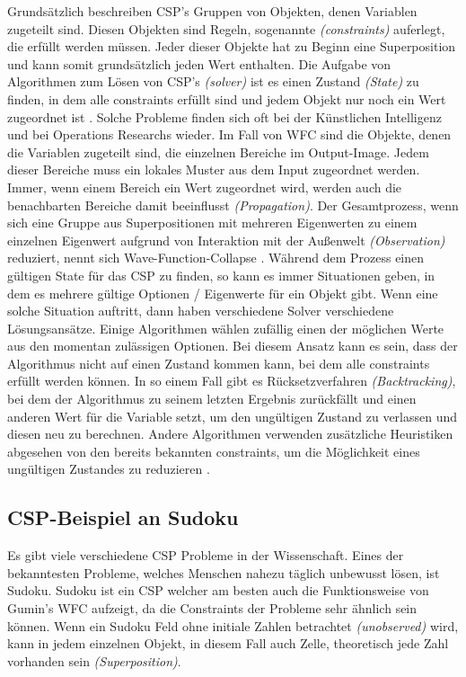 \documentclass[12pt, a4paper,twoside,openright]{report} %
\begin{document}
Grundsätzlich beschreiben CSP's Gruppen von Objekten, denen Variablen zugeteilt sind.
Diesen Objekten sind Regeln, sogenannte \textit{(constraints)} auferlegt, die erfüllt werden müssen.
Jeder dieser Objekte hat zu Beginn eine Superposition und kann somit grundsätzlich jeden Wert enthalten.
Die Aufgabe von Algorithmen zum Lösen von CSP's \textit{(solver)} ist es einen Zustand \textit{(State)} zu finden,
in dem alle constraints erfüllt sind und jedem Objekt nur noch ein Wert zugeordnet ist \cite{Lecoutre2009ConstraintNT}.
Solche Probleme finden sich oft bei der Künstlichen Intelligenz und bei Operations Researchs wieder.
Im Fall von WFC sind die Objekte, denen die Variablen zugeteilt sind, die einzelnen Bereiche im Output-Image.
Jedem dieser Bereiche muss ein lokales Muster aus dem Input zugeordnet werden.
Immer, wenn einem Bereich ein Wert zugeordnet wird, werden auch die benachbarten Bereiche damit beeinflusst \textit{(Propagation)}.
Der Gesamtprozess, wenn sich eine Gruppe aus Superpositionen mit mehreren Eigenwerten zu einem einzelnen Eigenwert aufgrund von Interaktion mit der Außenwelt \textit{(Observation)} reduziert,
nennt sich Wave-Function-Collapse \cite{Zinkernagel_2016}.
Während dem Prozess einen gültigen State für das CSP zu finden, so kann es immer Situationen geben, in dem es mehrere gültige Optionen / Eigenwerte für ein Objekt gibt.
Wenn eine solche Situation auftritt, dann haben verschiedene Solver verschiedene Lösungsansätze.
Einige Algorithmen wählen zufällig einen der möglichen Werte aus den momentan zulässigen Optionen.
Bei diesem Ansatz kann es sein, dass der Algorithmus nicht auf einen Zustand kommen kann, bei dem alle constraints erfüllt werden können.
In so einem Fall gibt es Rücksetzverfahren \textit{(Backtracking)}, bei dem der Algorithmus zu seinem letzten Ergebnis zurückfällt und einen anderen Wert für die Variable setzt,
um den ungültigen Zustand zu verlassen und diesen neu zu berechnen.
Andere Algorithmen verwenden zusätzliche Heuristiken abgesehen von den bereits bekannten constraints, um die Möglichkeit eines ungültigen Zustandes zu reduzieren \cite{Karth2017WaveFunctionCollapseIC}.
\pagebreak

\subsection{CSP-Beispiel an Sudoku}
Es gibt viele verschiedene CSP Probleme in der Wissenschaft.
Eines der bekanntesten Probleme, welches Menschen nahezu täglich unbewusst lösen, ist Sudoku.
Sudoku ist ein CSP welcher am besten auch die Funktionsweise von Gumin's WFC aufzeigt, da die Constraints der Probleme sehr ähnlich sein können.
Wenn ein Sudoku Feld ohne initiale Zahlen betrachtet \textit{(unobserved)} wird, kann in jedem einzelnen Objekt, in diesem Fall auch Zelle, theoretisch jede Zahl vorhanden sein \textit{(Superposition)}.
\end{document}
